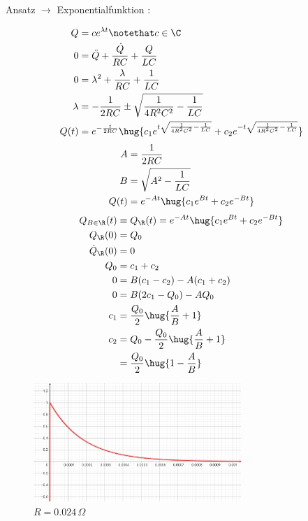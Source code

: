 \documentclass[11pt]{article}
\begin{document}
\subsection{}
\begin{adjustwidth}{20pt}{}
    Ansatz \(\rightarrow\) Exponentialfunktion :
\end{adjustwidth}
\begin{align*}
    Q &= c e^{\lambda t} \notethat c\in\C\\
    0 &= \ddot Q + \frac{\dot Q}{R C} + \frac Q{LC}\\
    0 &= \lambda^2 + \frac{\lambda}{R C} + \frac 1{LC}\\
    \lambda &= -\frac{1}{2 R C} \pm \sqrt{\frac{1}{4R^2 C^2} - \frac 1{LC}}\\
    Q(t) &= e^{-\frac t{2RC}} \hug{c_1 e^{t\sqrt{\frac{1}{4R^2 C^2} - \frac 1{LC}}}
    + c_2 e^{-t\sqrt{\frac{1}{4R^2 C^2} - \frac 1{LC}}}}\\
\end{align*}
\begin{align*}
    A &= \frac 1{2RC}\\
    B &= \sqrt{A^2 - \frac 1{LC}}\\
    Q(t) &= e^{-A t} \hug{c_1 e^{B t}+ c_2 e^{-B t}}
\end{align*}
\begin{align*}
    Q_{B\in\R}(t) &\equiv Q_\R(t)= e^{-A t} \hug{c_1 e^{B t}+ c_2 e^{-B t}}\\
    Q_\R(0) &= Q_0\\
    \dot Q_\R(0) &= 0\\ 
    Q_0 &= c_1 + c_2 \\
    0 &= B(c_1 - c_2) -A(c_1+c_2)\\
    0 &= B(2c_1 - Q_0) -A Q_0\\
    c_1 &= \frac {Q_0}2\hug{\frac AB + 1}\\
    c_2 &= Q_0 - \frac {Q_0}2\hug{\frac AB + 1}\\
    &= \frac {Q_0}2\hug{1 - \frac AB}
\end{align*}
\begin{figure}[h]
    \centering
    \includegraphics[width=0.7\textwidth]{0.024.png}
    \caption{\(R=0.024 \,\Omega\)}
\end{figure}
\end{document}
